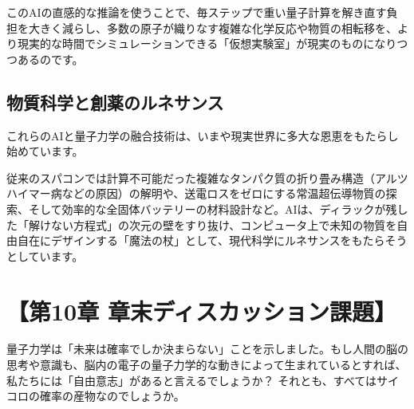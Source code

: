 このAIの直感的な推論を使うことで、毎ステップで重い量子計算を解き直す負担を大きく減らし、多数の原子が織りなす複雑な化学反応や物質の相転移を、より現実的な時間でシミュレーションできる「仮想実験室」が現実のものになりつつあるのです。

\subsection{物質科学と創薬のルネサンス}

これらのAIと量子力学の融合技術は、いまや現実世界に多大な恩恵をもたらし始めています。

従来のスパコンでは計算不可能だった複雑なタンパク質の折り畳み構造（アルツハイマー病などの原因）の解明や、送電ロスをゼロにする常温超伝導物質の探索、そして効率的な全固体バッテリーの材料設計など。AIは、ディラックが残した「解けない方程式」の次元の壁をすり抜け、コンピュータ上で未知の物質を自由自在にデザインする「魔法の杖」として、現代科学にルネサンスをもたらそうとしています。

\section*{【第10章 章末ディスカッション課題】}

量子力学は「未来は確率でしか決まらない」ことを示しました。もし人間の脳の思考や意識も、脳内の電子の量子力学的な動きによって生まれているとすれば、私たちには「自由意志」があると言えるでしょうか？ それとも、すべてはサイコロの確率の産物なのでしょうか。




